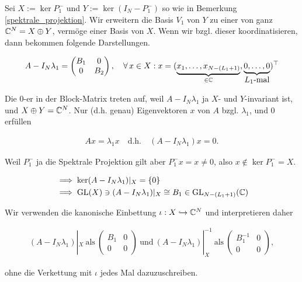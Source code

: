 \begin{remark} \label{semi_inverse}

    Sei $X := \ker P_1^-$ und $Y := \ker (I_N - P_1^-)$ so wie in Bemerkung \ref{spektrale_projektion}.
    Wir erweitern die Basis $V_1$ von $Y$ zu einer von ganz $\mathbb{C}^N = X \oplus Y$, vermöge einer Basis von $X$.
    Wenn wir bzgl. dieser koordinatisieren, dann bekommen folgende Darstellungen.

    \begin{align*}
        A - I_N \lambda_1
        =
        \begin{pmatrix}
            B_1 & 0 \\
            0   & B_2
        \end{pmatrix},
        \quad
        \forall \, x \in X:
            x
            =
            (
                \underbrace
                {
                    x_1, \dots, x_{N - (L_1 + 1)}
                }_{
                    \in \mathbb{C}
                },
                \underbrace
                {
                    0, \dots, 0
                }_{
                    \displaystyle
                    \text{$L_1$-mal}
                }
            )^\top
    \end{align*}

    Die $0$-er in der Block-Matrix treten auf, weil $A - I_N \lambda_1$ ja $X$- und $Y$-invariant ist, und $X \oplus Y = \mathbb{C}^N$.
    Nur (d.h. genau) Eigenvektoren $x$ von $A$ bzgl. $\lambda_1$, und $0$ erfüllen

    \begin{align*}
        A x = \lambda_1 x
        \quad
        \text{d.h.}
        \quad
        (A - I_N \lambda_1) x = 0.
    \end{align*}

    Weil $P_1^-$ ja die Spektrale Projektion gilt aber $P_1^- x = x \neq 0$, also $x \not \in \ker P_1^- = X$.

    \begin{align*}
        & \implies
        \ker (A - I_N \lambda_1) |_X = {\left \{ 0 \right \}} \\
        & \implies
        \operatorname{GL}(X) \ni (A - I_N \lambda_1) |_X \cong B_1 \in \operatorname{GL}_{N - (L_1 + 1)}(\mathbb{C})
    \end{align*}

    Wir verwenden die kanonische Einbettung $\iota: X \hookrightarrow \mathbb{C}^N$ und interpretieren daher

    \begin{align*}
        (A - I_N \lambda_1) |_X
        ~\text{als}~
        \begin{pmatrix}
            B_1 & 0 \\ 0 & 0
        \end{pmatrix}
        ~\text{und}~
        (A - I_N \lambda_1) |_X^{-1}
        ~\text{als}~
        \begin{pmatrix}
            B_1^{-1} & 0 \\ 0 & 0
        \end{pmatrix},
    \end{align*}

    ohne die Verkettung mit $\iota$ jedes Mal dazuzuschreiben.

\end{remark}